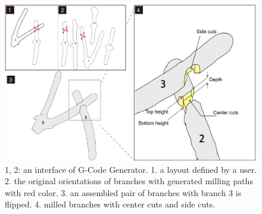 \begin{figure}[h]
	\begin{center}
		\includegraphics[width = 0.4\paperwidth]{images/system/joint_diagram.pdf}
		\caption{1, 2: an interface of G-Code Generator. 1. a layout defined by a user. 2. the original orientations of branches with generated milling paths with red color. 3. an assembled pair of branches with branch 3 is flipped. 4. milled branches with center cuts and side cuts.}
		\label{fig:joint_geometry}
	\end{center}
\end{figure}
